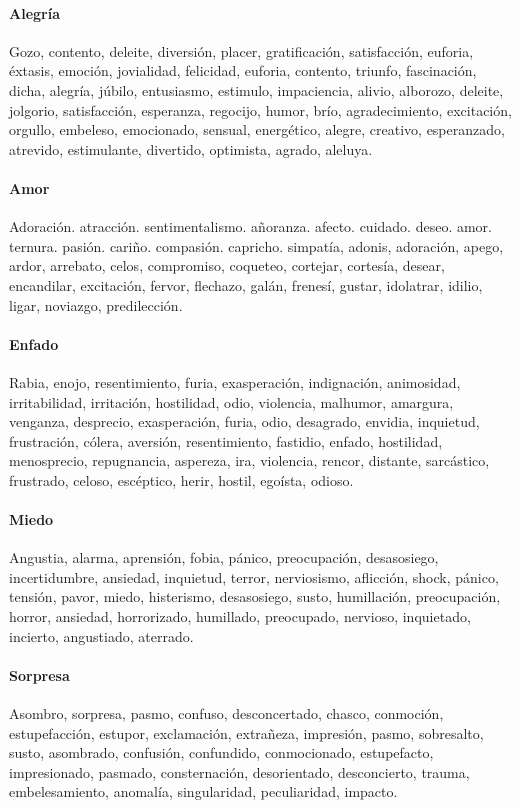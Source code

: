 \documentclass[../all.tex]{subfiles}
\begin{document}
    \paragraph{Alegría}
    Gozo, contento, deleite, diversión, placer, gratificación, satisfacción, euforia, éxtasis, emoción, jovialidad, felicidad, euforia, contento, triunfo, fascinación, dicha, alegría, júbilo, entusiasmo, estimulo, impaciencia, alivio, alborozo, deleite, jolgorio, satisfacción, esperanza, regocijo, humor, brío, agradecimiento, excitación, orgullo, embeleso, emocionado, sensual, energético, alegre, creativo, esperanzado, atrevido, estimulante, divertido, optimista, agrado, aleluya.
    \paragraph{Amor}
    Adoración. atracción. sentimentalismo. añoranza. afecto. cuidado. deseo. amor. ternura. pasión. cariño. compasión. capricho. simpatía, adonis, adoración, apego, ardor, arrebato, celos, compromiso, coqueteo, cortejar, cortesía, desear, encandilar, excitación, fervor, flechazo, galán, frenesí, gustar, idolatrar, idilio, ligar, noviazgo, predilección.
    \paragraph{Enfado}
    Rabia, enojo, resentimiento, furia, exasperación, indignación, animosidad, irritabilidad, irritación, hostilidad, odio, violencia, malhumor, amargura, venganza, desprecio, exasperación, furia, odio, desagrado, envidia, inquietud, frustración, cólera, aversión, resentimiento, fastidio, enfado, hostilidad, menosprecio, repugnancia, aspereza, ira, violencia, rencor, distante, sarcástico, frustrado, celoso, escéptico, herir, hostil, egoísta, odioso.
    \paragraph{Miedo}
    Angustia, alarma, aprensión, fobia, pánico, preocupación, desasosiego, incertidumbre, ansiedad, inquietud, terror, nerviosismo, aflicción, shock, pánico, tensión, pavor, miedo, histerismo, desasosiego, susto, humillación, preocupación, horror, ansiedad, horrorizado, humillado, preocupado, nervioso, inquietado, incierto, angustiado, aterrado.
    \newpage
    \paragraph{Sorpresa}
    Asombro, sorpresa, pasmo, confuso, desconcertado, chasco, conmoción, estupefacción, estupor, exclamación, extrañeza, impresión, pasmo, sobresalto, susto, asombrado, confusión, confundido, conmocionado, estupefacto, impresionado, pasmado, consternación, desorientado, desconcierto, trauma, embelesamiento, anomalía, singularidad, peculiaridad, impacto.
\end{document}
